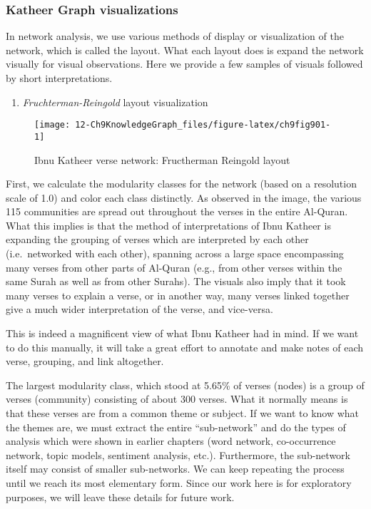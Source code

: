 \documentclass[
]{article}
\providecommand{\tightlist}{%
  \setlength{\itemsep}{0pt}\setlength{\parskip}{0pt}}
\begin{document}
\hypertarget{katheer-graph-visualizations}{%
\subsubsection{Katheer Graph visualizations}\label{katheer-graph-visualizations}}

In network analysis, we use various methods of display or visualization of the network, which is called the layout. What each layout does is expand the network visually for visual observations. Here we provide a few samples of visuals followed by short interpretations.

\begin{enumerate}
\def\labelenumi{\arabic{enumi}.}
\tightlist
\item
  \emph{Fruchterman-Reingold} layout visualization
\end{enumerate}

\begin{figure}

{\centering \texttt{[image: 12-Ch9KnowledgeGraph\_files/figure-latex/ch9fig901-1]} 

}

\caption{Ibnu Katheer verse network: Fructherman Reingold layout}\label{fig:ch9fig901}
\end{figure}

First, we calculate the modularity classes for the network (based on a resolution scale of 1.0) and color each class distinctly. As observed in the image, the various 115 communities are spread out throughout the verses in the entire Al-Quran. What this implies is that the method of interpretations of Ibnu Katheer is expanding the grouping of verses which are interpreted by each other (i.e.~networked with each other), spanning across a large space encompassing many verses from other parts of Al-Quran (e.g., from other verses within the same Surah as well as from other Surahs). The visuals also imply that it took many verses to explain a verse, or in another way, many verses linked together give a much wider interpretation of the verse, and vice-versa.

This is indeed a magnificent view of what Ibnu Katheer had in mind. If we want to do this manually, it will take a great effort to annotate and make notes of each verse, grouping, and link altogether.

The largest modularity class, which stood at 5.65\% of verses (nodes) is a group of verses (community) consisting of about 300 verses. What it normally means is that these verses are from a common theme or subject. If we want to know what the themes are, we must extract the entire ``sub-network'' and do the types of analysis which were shown in earlier chapters (word network, co-occurrence network, topic models, sentiment analysis, etc.). Furthermore, the sub-network itself may consist of smaller sub-networks. We can keep repeating the process until we reach its most elementary form. Since our work here is for exploratory purposes, we will leave these details for future work.
\end{document}
